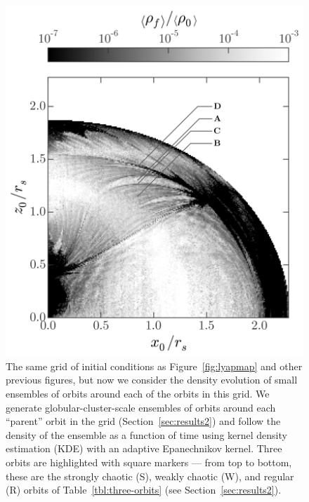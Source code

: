 \documentclass[letterpaper,12pt,preprint]{aastex}
\begin{document}
\clearpage
\begin{figure}[p]
\begin{center}
\includegraphics[width=\textwidth]{figures/ensemble-map.png}
\caption{The same grid of initial conditions as Figure~\ref{fig:lyapmap} and other previous figures, but now we consider the density evolution of small ensembles of orbits around each of the orbits in this grid. We generate globular-cluster-scale ensembles of orbits around each ``parent'' orbit in the grid (Section~\ref{sec:results2}) and follow the density of the ensemble as a function of time using kernel density estimation (KDE) with an adaptive Epanechnikov kernel. Three orbits are highlighted with square markers --- from top to bottom, these are the strongly chaotic (S), weakly chaotic (W), and regular (R) orbits of Table~\ref{tbl:three-orbits} (see Section~\ref{sec:results2}).} 
\label{fig:ensemblemap-meandensity}
\end{center}
\end{figure}
\end{document}
